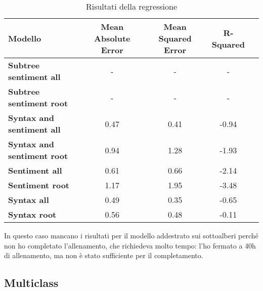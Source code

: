 \begin{table}[H]
    \centering
    \begin{tabular}{|l|c|c|c|c|}
    \hline
    \textbf{Modello} & \textbf{Mean Absolute Error} & \textbf{Mean Squared
    Error} & \textbf{R-Squared} \\
    \hline
    \textbf{Subtree sentiment all} & - & - & - \\
    \textbf{Subtree sentiment root} & - & - & - \\
    \hline

    \textbf{Syntax and sentiment all} & 0.47 & 0.41 & -0.94 \\
    \textbf{Syntax and sentiment root} & 0.94 & 1.28 & -1.93 \\
    \hline

    \textbf{Sentiment all} & 0.61 & 0.66 & -2.14 \\
    \textbf{Sentiment root} & 1.17 & 1.95 & -3.48 \\
    \hline

    \textbf{Syntax all} & 0.49 & 0.35 & -0.65 \\
    \textbf{Syntax root} & 0.56 & 0.48 & -0.11 \\
    \hline
    \end{tabular}
    \caption{Risultati della regressione}
\end{table}

In questo caso mancano i risultati per il modello addestrato sui sottoalberi
perché non ho completato l'allenamento, che richiedeva molto tempo: l'ho fermato
a 40h di allenamento, ma non è stato sufficiente per il completamento.

\subsection{Multiclass}

